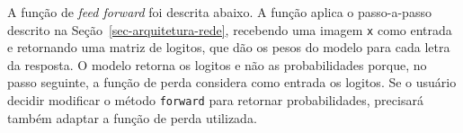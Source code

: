 \documentclass[12pt,twoside,brazilian]{book}
\newenvironment{Shaded}{\begin{snugshade}}{\end{snugshade}}
\newcommand{\AttributeTok}[1]{\textcolor[rgb]{0.40,0.45,0.13}{#1}}
\newcommand{\CommentTok}[1]{\textcolor[rgb]{0.37,0.37,0.37}{#1}}
\newcommand{\DecValTok}[1]{\textcolor[rgb]{0.68,0.00,0.00}{#1}}
\newcommand{\FunctionTok}[1]{\textcolor[rgb]{0.28,0.35,0.67}{#1}}
\newcommand{\NormalTok}[1]{\textcolor[rgb]{0.00,0.23,0.31}{#1}}
\newcommand{\OtherTok}[1]{\textcolor[rgb]{0.00,0.23,0.31}{#1}}
\newcommand{\SpecialCharTok}[1]{\textcolor[rgb]{0.37,0.37,0.37}{#1}}
\begin{document}
\begin{Shaded}
\end{Shaded}

A função de \emph{feed forward} foi descrita abaixo. A função aplica o
passo-a-passo descrito na Seção~\ref{sec-arquitetura-rede}, recebendo
uma imagem \texttt{x} como entrada e retornando uma matriz de logitos,
que dão os pesos do modelo para cada letra da resposta. O modelo retorna
os logitos e não as probabilidades porque, no passo seguinte, a função
de perda considera como entrada os logitos. Se o usuário decidir
modificar o método \texttt{forward} para retornar probabilidades,
precisará também adaptar a função de perda utilizada.
\end{document}
